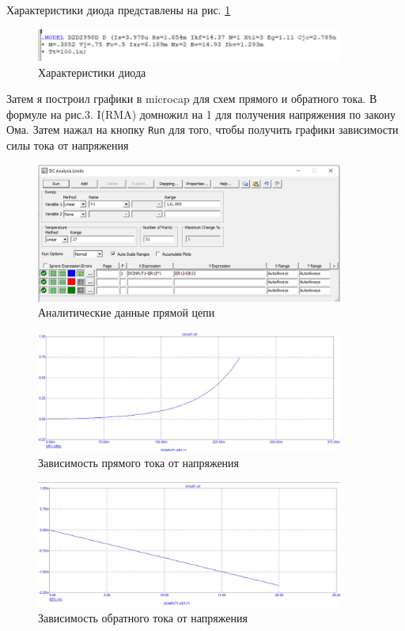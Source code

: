 	\noindent Характеристики диода представлены на рис. \ref{fig:02_main_mcp}
	
	\begin{figure}[ht]
		\centering
		\includegraphics[width=0.9\textwidth]{img/02_main_mcp.jpg}
		\captionsetup{font=footnotesize}
		\caption{Характеристики диода}
		\label{fig:02_main_mcp}
	\end{figure}
	
	
	\noindent Затем я построил графики в microcap для схем прямого и обратного тока. В формуле на рис.3. I(RMA) домножил на 1 для получения напряжения по закону Ома. Затем нажал на кнопку \texttt{Run} для того, чтобы получить графики зависимости силы тока от напряжения
	\begin{figure}[ht]
		\centering
		\includegraphics[width=0.9\textwidth]{img/05_main_mcp.jpg}
		\captionsetup{font=footnotesize}
		\caption{Аналитические данные прямой цепи}
		\label{fig:05_main_mcp}
	\end{figure}
	\begin{figure}[ht]
		\centering
		\includegraphics[width=0.9\textwidth]{img/03_main_mcp.jpg}
		\captionsetup{font=footnotesize}
		\caption{Зависимость прямого тока от напряжения}
		\label{fig:03_main_mcp}
	\end{figure}
	\begin{figure}[ht]
		\centering
		\includegraphics[width=0.9\textwidth]{img/02_back_mcp.jpg}
		\captionsetup{font=footnotesize}
		\caption{Зависимость обратного тока от напряжения}
		\label{fig:02_back_mcp}
	\end{figure}
